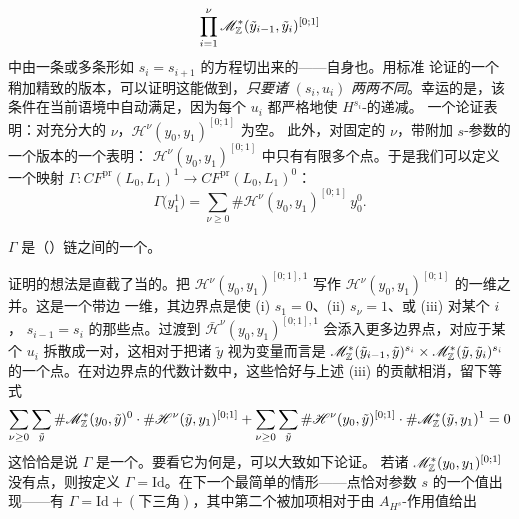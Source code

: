 \begin{equation*}
\prod_{i=1}^{\nu}\mathscr{M}^*_{\mathbb{Z}}(\tilde{y}_{i-1},\tilde{y}_i)^{[0;1]}
\end{equation*}
中由一条或多条形如 $s_i=s_{i+1}$ 的方程切出来的\trSubmanifold——自身也\trRegular。用标准%
\trTransversality{}论证的一个稍加精致的版本，可以证明这能做到，\emph{只要诸}
$(s_i,u_i)$ \emph{两两不同}。幸运的是，该条件在当前语境中自动满足，因为每个 $u_i$
都严格地使 $H^{s_i}$-\trPerturbation{}的\trActionFunctional{}递减。
一个\trEnergy{}论证表明：对充分大的 $\nu$，$\mathscr{H}^{\nu}(y_0,y_1)^{[0;1]}$ 为空。
此外，对固定的 $\nu$，带附加 $s$-参数的一个版本的一个\trGromov\trCompactification{}表明：
$\mathscr{H}^{\nu}(y_0,y_1)^{[0;1]}$ 中只有有限多个\trIsolated{}点。于是我们可以定义一个映射
$\Gamma\colon CF^{\mathrm{pr}}(L_0,L_1)^1\to CF^{\mathrm{pr}}(L_0,L_1)^0$：
\begin{equation}\label{eq:gamma-map}
\Gamma\bigl(y_1^1\bigr)=\sum_{\nu\ge 0}\#\mathscr{H}^{\nu}(y_0,y_1)^{[0;1]}\,y_0^0.
\end{equation}
\begin{lemma}\label{thm:gamma-chain-isomorphism}
$\Gamma$ 是（\trUngraded{}）链\trComplex{}之间的一个\trIsomorphism。
\end{lemma}
证明的想法是直截了当的。把 $\mathscr{H}^{\nu}(y_0,y_1)^{[0;1],1}$ 写作
$\mathscr{H}^{\nu}(y_0,y_1)^{[0;1]}$ 的一维\trConnectedComponent{}之并。这是一个带边%
一维\trManifold，其边界点是使 (i) $s_1=0$、(ii) $s_{\nu}=1$、或 (iii) 对某个 $i$，
$s_{i-1}=s_i$ 的那些点。过渡到\trGromov\trCompactification
$\bar{\mathscr{H}}^{\nu}(y_0,y_1)^{[0;1],1}$ 会添入更多边界点，对应于某个 $u_i$
拆散成一对\trFloer\trTrajectory，这相对于把诸 $\tilde{y}$ 视为变量而言是
$\mathscr{M}^*_{\mathbb{Z}}(\tilde{y}_{i-1},\tilde{y})^{s_i}\times\mathscr{M}^*_{\mathbb{Z}}(\tilde{y},\tilde{y}_i)^{s_i}$
的一个\trIsolated{}点。在对边界点的代数计数中，这些恰好与上述 (iii) 的贡献相消，留下等式
\begin{equation*}
\sum_{\nu\ge 0}\sum_{\tilde{y}}\#\mathscr{M}^*_{\mathbb{Z}}(y_0,\tilde{y})^0\cdot
\#\mathscr{H}^{\nu}(\tilde{y},y_1)^{[0;1]}
+\sum_{\nu\ge 0}\sum_{\tilde{y}}\#\mathscr{H}^{\nu}(y_0,\tilde{y})^{[0;1]}\cdot
\#\mathscr{M}^*_{\mathbb{Z}}(\tilde{y},y_1)^1=0
\end{equation*}
这恰恰是说 $\Gamma$ 是一个\trChainMap。要看它为何是\trIsomorphism，可以大致如下论证。
若诸\trModuliSpace{} $\mathscr{M}^*_{\mathbb{Z}}(y_0,y_1)^{[0;1]}$ 没有\trIsolated{}点，则按定义
$\Gamma=\mathrm{Id}$。在下一个最简单的情形——\trIsolated{}点恰对参数 $s$ 的一个值出现——有
$\Gamma=\mathrm{Id}+(\text{下三角})$，其中第二个被加项相对于由 $A_{H^s}$-作用值给出%
